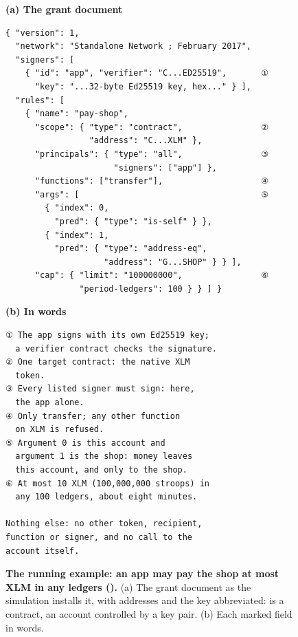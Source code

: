\begin{figure}[tbp]
\centering
\begin{minipage}[t]{0.49\linewidth}\footnotesize\textbf{(a) The grant document}
\begin{Verbatim}[fontsize=\scriptsize,frame=single,framesep=1.5mm]
{ "version": 1,
  "network": "Standalone Network ; February 2017",
  "signers": [
    { "id": "app", "verifier": "C...ED25519",       ①
      "key": "...32-byte Ed25519 key, hex..." } ],
  "rules": [
    { "name": "pay-shop",
      "scope": { "type": "contract",                ②
                 "address": "C...XLM" },
      "principals": { "type": "all",                ③
                      "signers": ["app"] },
      "functions": ["transfer"],                    ④
      "args": [                                     ⑤
        { "index": 0,
          "pred": { "type": "is-self" } },
        { "index": 1,
          "pred": { "type": "address-eq",
                    "address": "G...SHOP" } } ],
      "cap": { "limit": "100000000",                ⑥
               "period-ledgers": 100 } } ] }
\end{Verbatim}
\end{minipage}\hfill
\begin{minipage}[t]{0.49\linewidth}\footnotesize\textbf{(b) In words}
\begin{Verbatim}[fontsize=\scriptsize,frame=single,framesep=1.5mm]
① The app signs with its own Ed25519 key;
  a verifier contract checks the signature.
② One target contract: the native XLM
  token.
③ Every listed signer must sign: here,
  the app alone.
④ Only transfer; any other function
  on XLM is refused.
⑤ Argument 0 is this account and
  argument 1 is the shop: money leaves
  this account, and only to the shop.
⑥ At most 10 XLM (100,000,000 stroops) in
  any 100 ledgers, about eight minutes.

Nothing else: no other token, recipient,
function or signer, and no call to the
account itself.
\end{Verbatim}
\end{minipage}
\caption{\textbf{The running example: an app may pay the shop at most  XLM in any  ledgers ().} (a) The grant document as the simulation installs it, with addresses and the key abbreviated:  is a contract,  an account controlled by a key pair. (b) Each marked field in words.}\label{fig:fig-shop-grant}
\end{figure}
